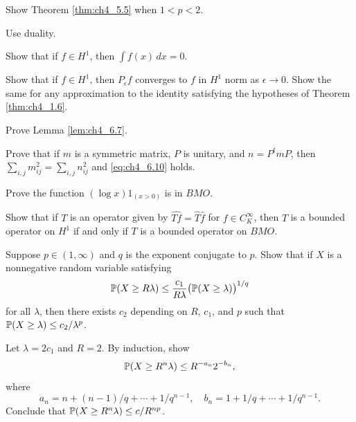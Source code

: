 \begin{exercise}\label{ex:ch4_23}
Show Theorem \ref{thm:ch4_5.5} when $1 < p < 2$.

\hint Use duality.
\end{exercise}

\begin{exercise}\label{ex:ch4_24}
Show that if $f \in H^1$, then $\int f(x)\,dx = 0$.
\end{exercise}

\begin{exercise}\label{ex:ch4_25}
Show that if $f \in H^1$, then $P_\epsilon f$ converges to $f$ in $H^1$ norm as $\epsilon \to 0$. Show the same for any approximation to the identity satisfying the hypotheses of Theorem \ref{thm:ch4_1.6}.
\end{exercise}

\begin{exercise}\label{ex:ch4_26}
Prove Lemma \ref{lem:ch4_6.7}.
\end{exercise}

\begin{exercise}\label{ex:ch4_27}
Prove that if $m$ is a symmetric matrix, $P$ is unitary, and $n = P^tm P$, then $\sum_{i,j} m_{ij}^2 = \sum_{i,j} n_{ij}^2$ and \eqref{eq:ch4_6.10} holds.
\end{exercise}

\begin{exercise}\label{ex:ch4_28}
Prove the function $(\log x)1_{(x>0)}$ is in $BMO$.
\end{exercise}

\begin{exercise}\label{ex:ch4_29}
Show that if $T$ is an operator given by $\widehat{Tf} = \widehat{T}\widehat{f}$ for $f \in C_K^\infty$, then $T$ is a bounded operator on $H^1$ if and only if $T$ is a bounded operator on $BMO$.
\end{exercise}

\begin{exercise}\label{ex:ch4_30}
Suppose $p \in (1,\infty)$ and $q$ is the exponent conjugate to $p$. Show that if $X$ is a nonnegative random variable satisfying
\[
    \P(X \geq R\lambda) \leq \frac{c_1}{R\lambda}\big(\P(X \geq \lambda)\big)^{1/q}
\]
for all $\lambda$, then there exists $c_2$ depending on $R$, $c_1$, and $p$ such that $\P(X \geq \lambda) \leq c_2/\lambda^p$.

\hint Let $\lambda = 2c_1$ and $R = 2$. By induction, show
\[
    \P(X \geq R^n\lambda) \leq R^{-a_n}2^{-b_n},
\]
where
\[
    a_n = n + (n-1)/q + \cdots + 1/q^{n-1}, \quad b_n = 1 + 1/q + \cdots + 1/q^{n-1}.
\]
\mnewpage
Conclude that $\P(X \geq R^n\lambda) \leq c/R^{np}$.
\end{exercise}

